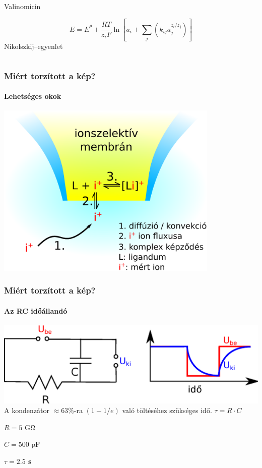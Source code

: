 \documentclass{beamer}
\begin{document}
\begin{frame}
\begin{columns}[T]
\begin{column}{.48\textwidth}
Valinomicin
\vfill

\footnotesize
\begin{equation*}
        E=E^\theta + \frac{RT}{z_iF} \ln \left [ a_i + \sum_{j} \left ( k_{ij}a_j^{z_i/z_j} \right ) \right ]
        \end{equation*}
\normalsize
Nikolszkij--egyenlet
\end{column}%
\end{columns}
\end{frame}

\begin{frame}
\frametitle{Miért torzított a kép?}
\framesubtitle{Lehetséges okok}
\centering
\includegraphics[width=0.8\textwidth]{npp.eps}
\end{frame}

\begin{frame}
        \frametitle{Miért torzított a kép?}
        \framesubtitle{Az RC időállandó}
        \centering
        \includegraphics[width=1\textwidth]{RC.eps}
        \vfill
        A kondenzátor $\approx 63\%$-ra $(1-1/e)$ való töltéséhez szükséges idő. 
        \vfill
        $\tau = R \cdot C$

        $R = 5 $ G$\ohm$

        $C = 500 $ pF

        \textbf{\textcolor{white!100}{\colorbox{red!100}{$\tau = 2.5 $ s}}}

\end{frame}
\end{document}

